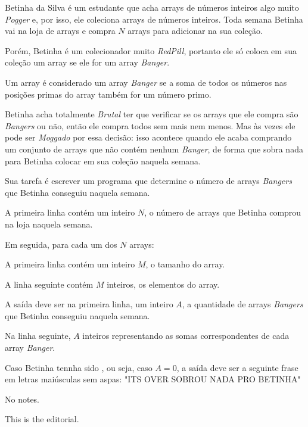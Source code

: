 Betinha da Silva é um estudante que acha arrays de números inteiros algo muito \textit{Pogger} e, por isso, ele coleciona arrays de números inteiros.  
Toda semana Betinha vai na loja de arrays e compra $N$ arrays para adicionar na sua coleção.  

Porém, Betinha é um colecionador muito \textit{RedPill}, portanto ele só coloca em sua coleção um array se ele for um array \textit{Banger}.  

Um array é considerado um array \textit{Banger} se a soma de todos os números nas posições primas do array também for um número primo.  

Betinha acha totalmente \textit{Brutal} ter que verificar se os arrays que ele compra são \textit{Bangers} ou não, então ele compra todos sem mais nem menos.  
Mas às vezes ele pode ser \textit{Moggado} por essa decisão: isso acontece quando ele acaba comprando um conjunto de arrays que não contém nenhum \textit{Banger}, de forma que sobra nada para Betinha colocar em sua coleção naquela semana.  

Sua tarefa é escrever um programa que determine o número de arrays \textit{Bangers} que Betinha conseguiu naquela semana.

A primeira linha contém um inteiro $N$, o número de arrays que Betinha comprou na loja naquela semana.  

Em seguida, para cada um dos $N$ arrays:  

A primeira linha contém um inteiro $M$, o tamanho do array.  

A linha seguinte contém $M$ inteiros, os elementos do array.  

A saída deve ser na primeira linha, um inteiro $A$, a quantidade de arrays \textit{Bangers} que Betinha conseguiu naquela semana.  

Na linha seguinte, $A$ inteiros representando as somas correspondentes de cada array \textit{Banger}.  

Caso Betinha tennha sido , ou seja, caso $A = 0$, a saída deve ser a seguinte frase em letras maiúsculas sem aspas: "ITS OVER SOBROU NADA PRO BETINHA"

No notes.

This is the editorial.
